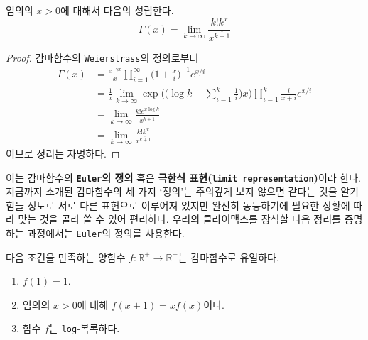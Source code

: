 \begin{theorem}[Euler]
    임의의 $x>0$에 대해서 다음의 성립한다.
    \begin{equation*}
        \Gamma(x)=\lim_{k\to\infty}\frac{k!k^x}{x^{\overline{k+1}}}
    \end{equation*}
\end{theorem}

\begin{proof}
    감마함수의 \texttt{Weierstrass}의 정의로부터
    \begin{align*}
        \Gamma(x)&=\frac{e^{-\gamma x}}{x}\prod_{i=1}^\infty\bigg(1+\frac{x}{i}\bigg)^{-1}e^{x/i}\\
        &=\frac{1}{x}\lim_{k\to\infty}\exp\bigg(\bigg(\log k-\sum_{i=1}^k\frac{1}{i}\bigg)x\bigg)\prod_{i=1}^k\frac{i}{x+i}e^{x/i}\\
        &=\lim_{k\to\infty}\frac{k!e^{x\log k}}{x^{\overline{k+1}}}\\
        &=\lim_{k\to\infty}\frac{k!k^x}{x^{\overline{k+1}}}
    \end{align*}
    이므로 정리는 자명하다.
\end{proof}

이는 감마함수의 \textbf{\texttt{Euler}의 정의} 혹은 \textbf{극한식 표현(\texttt{limit representation})}이라 한다. 지금까지 소개된 감마함수의 세 가지 `정의'는 주의깊게 보지 않으면 같다는 것을 알기 힘들 정도로 서로 다른 표현으로 이루어져 있지만 완전히 동등하기에 필요한 상황에 따라 맞는 것을 골라 쓸 수 있어 편리하다. 우리의 클라이맥스를 장식할 다음 정리를 증명하는 과정에서는 \texttt{Euler}의 정의를 사용한다.

\begin{theorem}
    다음 조건을 만족하는 양함수 $f:\mathbb{R}^+\to\mathbb{R}^+$는 감마함수로 유일하다.
    \begin{enumerate}
        \item $f(1)=1$.
        \item 임의의 $x>0$에 대해 $f(x+1)=xf(x)$이다.
        \item 함수 $f$는 \texttt{log}-복록하다.
    \end{enumerate}
\end{theorem}

